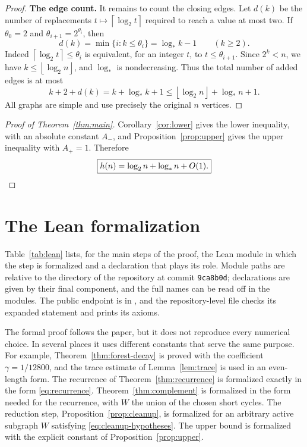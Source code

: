 \documentclass[11pt,a4paper]{article}
\numberwithin{equation}{section}
\theoremstyle{definition}
\theoremstyle{remark}
\newcommand{\lstar}{\log_*}
\newcommand{\proofstep}[1]{\par\addvspace{\medskipamount}\noindent\textbf{#1}\enspace\ignorespaces}
\newcommand{\ceil}[1]{\left\lceil#1\right\rceil}
\newcommand{\floor}[1]{\left\lfloor#1\right\rfloor}
\begin{document}
\begin{proof}
\proofstep{The edge count.}
It remains to count the closing edges. Let $d(k)$ be the number of replacements $t\mapsto\ceil{\log_2t}$ required to reach a value at most two. If $\theta_0=2$ and $\theta_{i+1}=2^{\theta_i}$, then
\[
 d(k)=\min\{i:k\le \theta_i\}=\lstar k-1\qquad(k\ge2).
\]
Indeed $\ceil{\log_2t}\le \theta_i$ is equivalent, for an integer $t$, to $t\le \theta_{i+1}$. Since $2^k<n$, we have $k\le\floor{\log_2n}$, and $\lstar$ is nondecreasing. Thus the total number of added edges is at most
\[
 k+2+d(k)=k+\lstar k+1\le\floor{\log_2n}+\lstar n+1.
\]
All graphs are simple and use precisely the original $n$ vertices.
\end{proof}

\begin{proof}[Proof of Theorem~\ref{thm:main}]
Corollary~\ref{cor:lower} gives the lower inequality, with an absolute constant $A_-$, and Proposition~\ref{prop:upper} gives the upper inequality with $A_+=1$. Therefore
\[
 \boxed{h(n)=\log_2n+\log_*n+O(1).}\qedhere
\]
\end{proof}

\appendix
\section{The Lean formalization}\label{app:lean}
Table~\ref{tab:lean} lists, for the main steps of the proof, the Lean module in which the step is formalized and a declaration that plays its role. Module paths are relative to the directory  of the repository at commit \texttt{9ca8b0d}; declarations are given by their final component, and the full names can be read off in the modules. The public endpoint is  in , and the repository-level file  checks its expanded statement and prints its axioms.

The formal proof follows the paper, but it does not reproduce every numerical choice. In several places it uses different constants that serve the same purpose. For example, Theorem~\ref{thm:forest-decay} is proved with the coefficient $\gamma=1/12800$, and the trace estimate of Lemma~\ref{lem:trace} is used in an even-length form. The recurrence of Theorem~\ref{thm:recurrence} is formalized exactly in the form \eqref{eq:recurrence}. Theorem~\ref{thm:complement} is formalized in the form needed for the recurrence, with $W$ the union of the chosen short cycles. The reduction step, Proposition~\ref{prop:cleanup}, is formalized for an arbitrary active subgraph $W$ satisfying \eqref{eq:cleanup-hypotheses}. The upper bound is formalized with the explicit constant of Proposition~\ref{prop:upper}.
\end{document}
